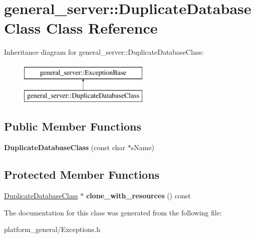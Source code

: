 \hypertarget{classgeneral__server_1_1DuplicateDatabaseClass}{\section{general\-\_\-server\-:\-:\-Duplicate\-Database\-Class \-Class \-Reference}
\label{classgeneral__server_1_1DuplicateDatabaseClass}
}
\-Inheritance diagram for general\-\_\-server\-:\-:\-Duplicate\-Database\-Class\-:\begin{figure}[H]
\begin{center}
\leavevmode
\includegraphics[height=2.000000cm]{classgeneral__server_1_1DuplicateDatabaseClass}
\end{center}
\end{figure}
\subsection*{\-Public \-Member \-Functions}
\begin{DoxyCompactItemize}
\item 
\hypertarget{classgeneral__server_1_1DuplicateDatabaseClass_a7979fc796e2e3b7b02695b37117865e4}{{\bfseries \-Duplicate\-Database\-Class} (const char $\ast$s\-Name)}\label{classgeneral__server_1_1DuplicateDatabaseClass_a7979fc796e2e3b7b02695b37117865e4}

\end{DoxyCompactItemize}
\subsection*{\-Protected \-Member \-Functions}
\begin{DoxyCompactItemize}
\item 
\hypertarget{classgeneral__server_1_1DuplicateDatabaseClass_abf0935639c31c253e10544aa93f5f6b5}{\hyperlink{classgeneral__server_1_1DuplicateDatabaseClass}{\-Duplicate\-Database\-Class} $\ast$ {\bfseries clone\-\_\-with\-\_\-resources} () const }\label{classgeneral__server_1_1DuplicateDatabaseClass_abf0935639c31c253e10544aa93f5f6b5}

\end{DoxyCompactItemize}


\-The documentation for this class was generated from the following file\-:\begin{DoxyCompactItemize}
\item 
platform\-\_\-general/\-Exceptions.\-h\end{DoxyCompactItemize}
